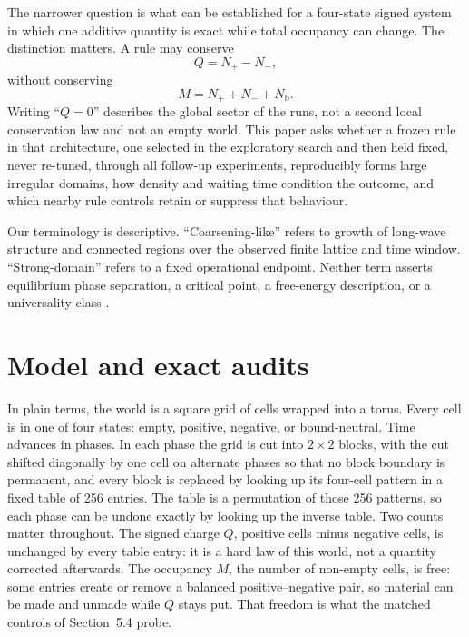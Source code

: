 \documentclass[11pt,a4paper]{article}
\begin{document}
The narrower question is what can be established for a four-state signed system in which one additive quantity is exact while total occupancy can change. The distinction matters. A rule may conserve
\begin{equation}
Q=N_{+}-N_{-},
\end{equation}
without conserving
\begin{equation}
M=N_{+}+N_{-}+N_{\mathrm b}.
\end{equation}
Writing ``$Q=0$'' describes the global sector of the runs, not a second local conservation law and not an empty world. This paper asks whether a frozen rule in that architecture, one selected in the exploratory search and then held fixed, never re-tuned, through all follow-up experiments, reproducibly forms large irregular domains, how density and waiting time condition the outcome, and which nearby rule controls retain or suppress that behaviour.

Our terminology is descriptive. ``Coarsening-like'' refers to growth of long-wave structure and connected regions over the observed finite lattice and time window. ``Strong-domain'' refers to a fixed operational endpoint. Neither term asserts equilibrium phase separation, a critical point, a free-energy description, or a universality class \citep{HohenbergHalperin1977,Bray1994}.

\section{Model and exact audits}
In plain terms, the world is a square grid of cells wrapped into a torus. Every cell is in one of four states: empty, positive, negative, or bound-neutral. Time advances in phases. In each phase the grid is cut into $2\times2$ blocks, with the cut shifted diagonally by one cell on alternate phases so that no block boundary is permanent, and every block is replaced by looking up its four-cell pattern in a fixed table of 256 entries. The table is a permutation of those 256 patterns, so each phase can be undone exactly by looking up the inverse table. Two counts matter throughout. The signed charge $Q$, positive cells minus negative cells, is unchanged by every table entry: it is a hard law of this world, not a quantity corrected afterwards. The occupancy $M$, the number of non-empty cells, is free: some entries create or remove a balanced positive--negative pair, so material can be made and unmade while $Q$ stays put. That freedom is what the matched controls of Section~5.4 probe.
\end{document}
